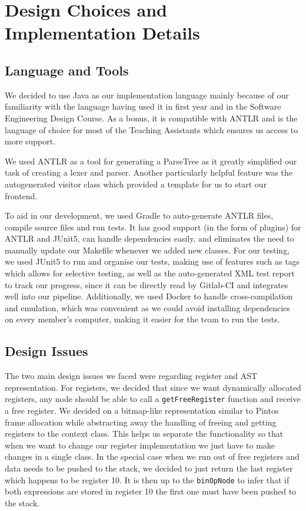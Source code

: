 \documentclass[11pt,a4paper]{article}
\newcommand{\cmd}[1]{\texttt{#1}}
\begin{document}
\section{Design Choices and Implementation Details}
\subsection{Language and Tools}
We decided to use Java as our implementation language mainly because of our familiarity with the language having used it in first year and in the Software Engineering Design Course. As a bonus, it is compatible with ANTLR and is the language of choice for most of the Teaching Assistants which ensures us access to more support. 

We used ANTLR as a tool for generating a ParseTree as it greatly simplified our task of creating a lexer and parser. Another particularly helpful feature was the autogenerated visitor class which provided a template for us to start our frontend.

To aid in our development, we used Gradle to auto-generate ANTLR files, compile source files and run tests. It has good support (in the form of plugins) for ANTLR and JUnit5, can handle dependencies easily, and eliminates the need to manually update our Makefile whenever we added new classes. For our testing, we used JUnit5 to run and organise our tests, making use of features such as tags which allows for selective testing, as well as the auto-generated XML test report to track our progress, since it can be directly read by Gitlab-CI and integrates well into our pipeline. Additionally, we used Docker to handle cross-compilation and emulation, which was convenient as we could avoid installing dependencies on every member’s computer, making it easier for the team to run the tests.

\subsection{Design Issues}
The two main design issues we faced were regarding register and AST  representation. For registers, we decided that since we want dynamically allocated registers, any node should be able to call a \cmd{getFreeRegister} function and receive a free register. We decided on a bitmap-like representation similar to Pintos frame allocation while abstracting away the handling of freeing and getting registers to the context class. This helps us separate the functionality so that when we want to change our register implementation we just have to make changes in a single class.  In the special case when we run out of free registers and data needs to be pushed to the stack, we decided to just return the last register which happens to be register 10. It is then up to the \cmd{binOpNode} to infer that if both expressions are stored in register 10 the first one must have been pushed to the stack. 
\end{document}

